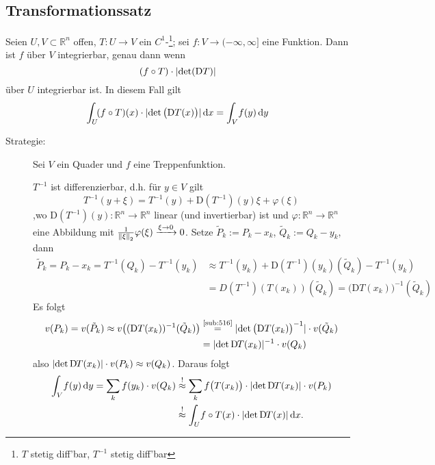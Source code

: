 \subsection{Transformationssatz} %
\label{sub:81}
Seien $U,V \subset \mathds{R}^n$ offen, $T : U \to V$ ein $C^1$-\footnote{$T$ stetig diff'bar, $T ^{-1}$ stetig diff'bar}; sei 
$f : V \to (-\infty, \infty]$ eine Funktion. Dann ist $f$ über $V$ integrierbar, genau dann wenn 
\[
	(f \circ T) \cdot \lvert\det(\mathrm{D}T)\rvert
\]
über $U$ integrierbar ist. In diesem Fall gilt
\[
	\int_U\! (f \circ T)(x) \cdot \lvert\det \big(\mathrm{D} T (x)\big)\rvert  \, \mathrm{d}x  = \int_V\! f(y)  \, \mathrm{d}y 
\]
\begin{description}
	\item[Strategie:] Sei $V$ ein Quader und $f$ eine Treppenfunktion. 
	\begin{figure}[h]
	\end{figure} 
	$T ^{-1}$ ist differenzierbar, d.h. für $y \in V$ gilt 
	\[
		T ^{-1} (y+ \xi) = T ^{-1}(y)+ \mathrm{D}(T ^{-1})(y) \xi + \varphi(\xi)
	\]
	,wo $\mathrm{D}(T ^{-1})(y) : \mathds{R}^n \to \mathds{R}^n$ linear (und invertierbar) ist und $\varphi: \mathds{R}^n \to \mathds{R}^n$ eine Abbildung mit 
	$\frac{1}{\norm[2]{\xi} } \varphi(\xi) \xrightarrow{\xi \to 0} 0 $. Setze $\tilde P_k := P_k - x_k$, $\tilde Q_k := Q_k - y_k$, dann
	\begin{align*}
		\tilde P_k = P_k - x_k = T ^{-1}(Q_k) - T ^{-1}(y_k) &\approx T ^{-1}(y_k)+ \mathrm{D}(T ^{-1})(y_k)(\tilde Q_k) - T ^{-1}(y_k) \\
		&= D(T ^{-1})(T(x_k))(\tilde Q_k) = \big(\mathrm{D}T(x_k)\big) ^{-1} (\tilde Q_k)
	\end{align*}
	Es folgt
	\begin{align*}
		v(P_k) = v(\tilde P_k) \approx v\big( (\mathrm{D} T(x_k)) ^{-1} (\tilde Q_k)\big) &\stackrel{\text{\ref{sub:516}}}{=} \lvert\det \big(\mathrm{D}T (x_k)\big) ^{-1}\rvert 
		\cdot v(\tilde Q_k) \\
		&= \lvert \det \mathrm{D}\mkern-1.5mu T(x_k)\rvert ^{-1} \cdot v(Q_k) 
	\end{align*}
	also $\lvert\det \mathrm{D}\mkern-1.5mu T(x_k)\rvert \cdot v(P_k) \approx v(Q_k) $. Daraus folgt
	\begin{align*}
		\int_V\! f(y)  \, \mathrm{d}y = \sum_{k} f(y_k) \cdot v(Q_k) &\stackrel{!}{\approx} \sum_{k} f\big(T(x_k)\big) \cdot \lvert\det \mathrm{D}\mkern-1.5mu T(x_k)\rvert \cdot v(P_k)   \\
		&\stackrel{!}{\approx} \int_U\! f \circ T(x) \cdot \lvert\det \mathrm{D}\mkern-1.5mu T(x)\rvert  \, \mathrm{d}x.
	\end{align*}
\end{description}

